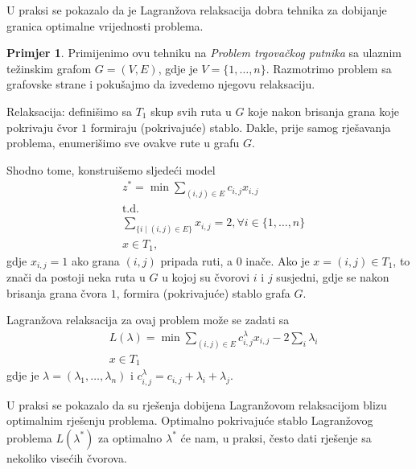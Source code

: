 \documentclass[b5paper, utf8, 11pt, colorlinks]{book}
\theoremstyle{definition}
\newtheorem{primjer}{Primjer}[chapter]
\begin{document}
U praksi se pokazalo da je Lagranžova relaksacija dobra tehnika za dobijanje granica optimalne vrijednosti problema. 
 
\begin{primjer}
Primijenimo ovu tehniku na \emph{Problem trgovačkog putnika} sa ulaznim težinskim grafom $G=(V,E)$, gdje je $V=\{1, \ldots, n\}$.  Razmotrimo  problem sa grafovske strane i pokušajmo da izvedemo njegovu relaksaciju. %
\end{primjer}
Relaksacija: definišimo sa $T_1$ skup svih ruta  u $G$  koje nakon brisanja grana koje pokrivaju čvor $1$ formiraju (pokrivajuće) stablo.  Dakle, prije samog rješavanja problema, enumerišimo sve ovakve rute u grafu $G$. 

Shodno tome, konstruišemo sljedeći model
\begin{align*}
    &z^* = \min \sum_{(i,j)\in E} c_{i,j} x_{i,j}\\
    & \mbox{t.d.} \\
    & \sum_{ \{ i \mid (i,j) \in E \} } x_{i,j} = 2, \forall i \in \{1,\ldots, n \} \\
    & x \in T_1,
\end{align*}
gdje $x_{i,j} = 1$ ako grana $(i,j)$ pripada ruti, a 0 inače. Ako je $x=(i, j) \in T_1$, to znači da postoji neka ruta u $G$ u kojoj su čvorovi $i$ i $j$ susjedni, gdje se nakon brisanja grana čvora $1$, formira (pokrivajuće) stablo grafa $G$. 

Lagranžova relaksacija za ovaj problem može se zadati sa 
\begin{align*}
     &L(\lambda) = \min \sum_{(i,j)\in E} c^\lambda_{i,j} x_{i,j} - 2 \sum_{i} \lambda_i \label{eq:tsp-lagrangean}\\
     & x \in T_1
\end{align*}
gdje je $\lambda=(\lambda_1, \ldots, \lambda_n)$ i $c^\lambda_{i,j} = c_{i,j} + \lambda_i + \lambda_j$. 

U praksi se pokazalo da su rješenja dobijena Lagranžovom relaksacijom blizu optimalnim rješenju problema. Optimalno pokrivajuće stablo Lagranžovog problema $L(\lambda^*)$ za optimalno $\lambda^*$ će nam,  u praksi, često dati rješenje sa  nekoliko visećih čvorova. 
\end{document}

